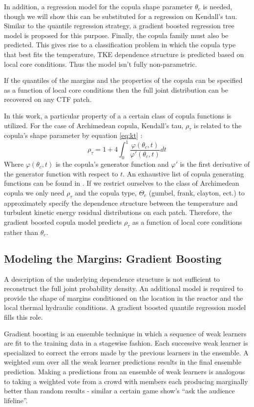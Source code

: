 In addition, a regression model for the copula shape parameter $\theta_c$ is needed, though we will show this can be substituted for a regression on Kendall's tau.  Similar to the quantile regression strategy, a gradient boosted regression tree model is proposed for this purpose.  Finally, the copula family must also be predicted.  This gives rise to a classification problem in which the copula type that best fits the temperature, TKE dependence structure is predicted based on local core conditions.  Thus the model isn't fully non-parametric.

If the quantiles of the margins and the properties of the copula can be specified as a function of local core conditions then the full joint distribution can be recovered on any CTF patch.

In this work, a particular property of a a certain class of copula functions is utilized.
For the case of Archimedean copula, Kendall's tau, $\rho_\tau$ is
related to the copula's shape parameter by equation \ref{eq:kt} \cite{Nelsen2006}:
\begin{equation}
\rho_\tau = 1 + 4 \int_0^1 \frac{\varphi(\theta_c,t)}{\varphi'(\theta_c, t)}dt
\label{eq:kt}
\end{equation}
Where $\varphi(\theta_c, t)$ is the copula's generator function and $\varphi'$ is the first derivative of the generator function with respect to $t$.  An exhaustive list of copula generating functions can be found in \cite{Nelsen2006}.
If we restrict ourselves to the class of Archimedean copula we only need $\rho_\tau$ and the copula type, $\Theta_c$ (gumbel, frank, clayton, ect.) to approximately specify the dependence structure between the temperature and turbulent kinetic energy residual distributions on each patch.  Therefore, the gradient boosted copula model predicts $\rho_\tau$ as a function of local core conditions rather than $\theta_c$.

\subsection{Modeling the Margins: Gradient Boosting}

A description of the underlying dependence structure is not sufficient to reconstruct the full joint probability density.  An additional model is required to provide the shape of margins conditioned on the location in the reactor and the local thermal hydraulic conditions.  A gradient boosted quantile regression model fills this role.

Gradient boosting is an ensemble technique in which a sequence of weak learners are fit to the training data in a stagewise fashion.  Each successive weak learner is specialized to correct the errors made by the previous learners in the ensemble.  A weighted sum over all the weak learner predictions results in the final ensemble prediction.  Making a predictions from an ensemble of weak learners is analogous to taking a weighted vote from a crowd with members each producing marginally better than random results - similar a certain game show's ``ask the audience lifeline''.  


